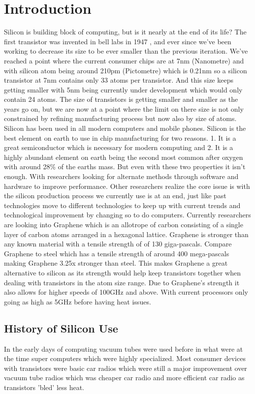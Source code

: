 \documentclass[journal]{IEEEtran}
\begin{document}
\section{Introduction}
Silicon is building block of computing, but is it nearly at the end of its life? The first transistor was invented in bell labs in 1947 \cite{8896076320180101}, and ever since we've been working to decrease its size to be ever smaller than the previous iteration. We've reached a point where the current consumer chips are at 7nm (Nanometre) and with silicon atom \cite{8947487520180101} being around 210pm (Pictometre) which is 0.21nm so a silicon transistor at 7nm contains only 33 atoms per transistor. And this size keeps getting smaller with 5nm being currently under development which would only contain 24 atoms. The size of transistors is getting smaller and smaller as the years go on, but we are now at a point where the limit on there size is not only constrained by refining manufacturing process but now also by size of atoms. Silicon has been used in all modern computers and mobile phones. Silicon is the best element on earth to use in chip manufacturing for two reasons. 1. It is a great semiconductor which is necessary for modern computing and 2. It is a highly abundant element on earth being the second most common after oxygen with around 28\% of the earths mass. But even with these two properties it isn't enough. With researchers looking for alternate methods through software and hardware to improve performance. Other researchers realize the core issue is with the silicon production process we currently use is at an end, just like past technologies move to different technologies to keep up with current trends and technological improvement by changing so to do computers. Currently researchers are looking into Graphene \cite{nicol_2018} which is an allotrope of carbon consisting of a single layer of carbon atoms arranged in a hexagonal lattice. Graphene is stronger than any known material with a tensile strength of  of 130 giga-pascals. Compare Graphene to steel which has a tensile strength of around 400 mega-pascals making Graphene 3.25x stronger than steel. This makes Graphene a great alternative to silicon as its strength would help keep transistors together when dealing with transistors in the atom size range. Due to Graphene's strength it also allows for higher speeds of 100GHz \cite{johnson_2010} and above. With current processors only going as high as 5GHz before having heat issues.

\subsection{History of Silicon Use}
In the early days of computing vacuum tubes \cite{8931727020180101} were used before in what were at the time super computers which were highly specialized. Most consumer devices with transistors were basic car radios which were still a major improvement over vacuum tube radios which was cheaper car radio and more efficient car radio as transistors 'bled' less heat.
\end{document}

